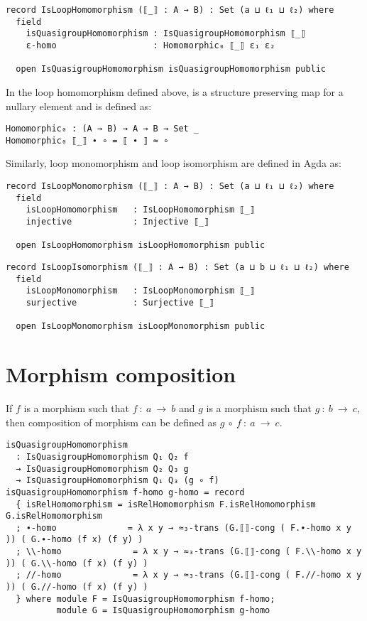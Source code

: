 \begin{verbatim}
record IsLoopHomomorphism (⟦_⟧ : A → B) : Set (a ⊔ ℓ₁ ⊔ ℓ₂) where
  field
    isQuasigroupHomomorphism : IsQuasigroupHomomorphism ⟦_⟧
    ε-homo                   : Homomorphic₀ ⟦_⟧ ε₁ ε₂

  open IsQuasigroupHomomorphism isQuasigroupHomomorphism public
\end{verbatim}

In the loop homomorphism defined above,  is a structure
preserving map for a nullary element and is defined as:

\begin{verbatim}
Homomorphic₀ : (A → B) → A → B → Set _
Homomorphic₀ ⟦_⟧ ∙ ∘ = ⟦ ∙ ⟧ ≈ ∘
\end{verbatim}

Similarly, loop monomorphism and loop isomorphism are defined in Agda as:

\begin{verbatim}
record IsLoopMonomorphism (⟦_⟧ : A → B) : Set (a ⊔ ℓ₁ ⊔ ℓ₂) where
  field
    isLoopHomomorphism   : IsLoopHomomorphism ⟦_⟧
    injective            : Injective ⟦_⟧

  open IsLoopHomomorphism isLoopHomomorphism public
\end{verbatim}

\begin{verbatim}  
record IsLoopIsomorphism (⟦_⟧ : A → B) : Set (a ⊔ b ⊔ ℓ₁ ⊔ ℓ₂) where
  field
    isLoopMonomorphism   : IsLoopMonomorphism ⟦_⟧
    surjective           : Surjective ⟦_⟧

  open IsLoopMonomorphism isLoopMonomorphism public
\end{verbatim}

\section{Morphism composition}
If $f$ is a morphism such that $f\ :\ a \ \rightarrow \ b$ and $g$ is a morphism
such that $g\ :\ b\ \rightarrow \ c$, then composition of morphism can be
defined as $g \ ∘\ f\ :\ a \ \rightarrow \ c$. 

\begin{verbatim}
isQuasigroupHomomorphism
  : IsQuasigroupHomomorphism Q₁ Q₂ f
  → IsQuasigroupHomomorphism Q₂ Q₃ g
  → IsQuasigroupHomomorphism Q₁ Q₃ (g ∘ f)
isQuasigroupHomomorphism f-homo g-homo = record
  { isRelHomomorphism = isRelHomomorphism F.isRelHomomorphism G.isRelHomomorphism
  ; ∙-homo              = λ x y → ≈₃-trans (G.⟦⟧-cong ( F.∙-homo x y )) ( G.∙-homo (f x) (f y) )
  ; \\-homo              = λ x y → ≈₃-trans (G.⟦⟧-cong ( F.\\-homo x y )) ( G.\\-homo (f x) (f y) )
  ; //-homo              = λ x y → ≈₃-trans (G.⟦⟧-cong ( F.//-homo x y )) ( G.//-homo (f x) (f y) )
  } where module F = IsQuasigroupHomomorphism f-homo; 
          module G = IsQuasigroupHomomorphism g-homo
\end{verbatim}

